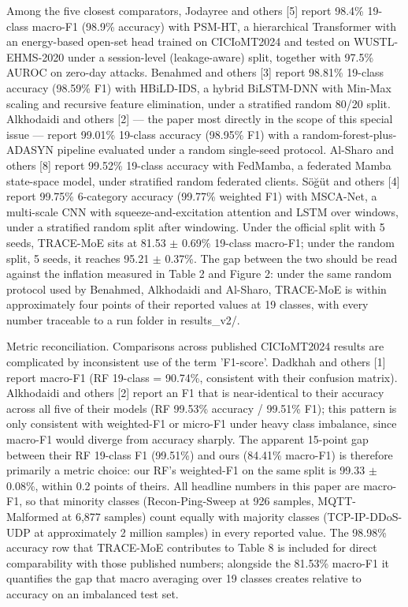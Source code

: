 \documentclass[11pt]{article}
\begin{document}
Among the five closest comparators, Jodayree and others [5] report 98.4\% 19-class macro-F1 (98.9\% accuracy) with PSM-HT, a hierarchical Transformer with an energy-based open-set head trained on CICIoMT2024 and tested on WUSTL-EHMS-2020 under a session-level (leakage-aware) split, together with 97.5\% AUROC on zero-day attacks. Benahmed and others [3] report 98.81\% 19-class accuracy (98.59\% F1) with HBiLD-IDS, a hybrid BiLSTM-DNN with Min-Max scaling and recursive feature elimination, under a stratified random 80/20 split. Alkhodaidi and others [2] --- the paper most directly in the scope of this special issue --- report 99.01\% 19-class accuracy (98.95\% F1) with a random-forest-plus-ADASYN pipeline evaluated under a random single-seed protocol. Al-Sharo and others [8] report 99.52\% 19-class accuracy with FedMamba, a federated Mamba state-space model, under stratified random federated clients. Söğüt and others [4] report 99.75\% 6-category accuracy (99.77\% weighted F1) with MSCA-Net, a multi-scale CNN with squeeze-and-excitation attention and LSTM over windows, under a stratified random split after windowing. Under the official split with 5 seeds, TRACE-MoE sits at 81.53 $\pm$ 0.69\% 19-class macro-F1; under the random split, 5 seeds, it reaches 95.21 $\pm$ 0.37\%. The gap between the two should be read against the inflation measured in Table 2 and Figure 2: under the same random protocol used by Benahmed, Alkhodaidi and Al-Sharo, TRACE-MoE is within approximately four points of their reported values at 19 classes, with every number traceable to a run folder in results\_v2/.

Metric reconciliation. Comparisons across published CICIoMT2024 results are complicated by inconsistent use of the term 'F1-score'. Dadkhah and others [1] report macro-F1 (RF 19-class = 90.74\%, consistent with their confusion matrix). Alkhodaidi and others [2] report an F1 that is near-identical to their accuracy across all five of their models (RF 99.53\% accuracy / 99.51\% F1); this pattern is only consistent with weighted-F1 or micro-F1 under heavy class imbalance, since macro-F1 would diverge from accuracy sharply. The apparent 15-point gap between their RF 19-class F1 (99.51\%) and ours (84.41\% macro-F1) is therefore primarily a metric choice: our RF's weighted-F1 on the same split is 99.33 $\pm$ 0.08\%, within 0.2 points of theirs. All headline numbers in this paper are macro-F1, so that minority classes (Recon-Ping-Sweep at 926 samples, MQTT-Malformed at 6,877 samples) count equally with majority classes (TCP-IP-DDoS-UDP at approximately 2 million samples) in every reported value. The 98.98\% accuracy row that TRACE-MoE contributes to Table 8 is included for direct comparability with those published numbers; alongside the 81.53\% macro-F1 it quantifies the gap that macro averaging over 19 classes creates relative to accuracy on an imbalanced test set.
\end{document}
